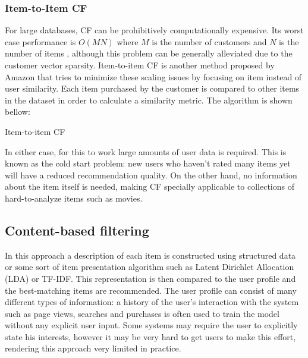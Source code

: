 \documentclass[cic,tc,english]{iiufrgs}
\begin{document}
\subsubsection{Item-to-Item CF}
For large databases, CF can be prohibitively computationally expensive. Its worst case performance is \(O(MN)\) where \(M\) is the number of customers and \(N\) is the number of items \cite{Linden2003}, although this problem can be generally alleviated due to the customer vector sparsity. Item-to-item CF is another method proposed by Amazon that tries to minimize these scaling issues by focusing on item instead of user similarity. Each item purchased by the customer is compared to other items in the dataset in order to calculate a similarity metric. The algorithm is shown bellow:

\begin{algorithm}[H]
 \caption{Item-to-item CF}
\end{algorithm}

In either case, for this to work large amounts of user data is required. This is known as the cold start problem: new users who haven't rated many items yet will have a reduced recommendation quality. On the other hand, no information about the item itself is needed, making CF specially applicable to collections of hard-to-analyze items such as movies.

\subsection{Content-based filtering}
In this approach a description of each item is constructed using structured data or some sort of item presentation algorithm such as Latent Dirichlet Allocation (LDA) or TF-IDF. This representation is then compared to the user profile and the best-matching items are recommended. The user profile can consist of many different types of information: a history of the user's interaction with the system such as page views, searches and purchases is often used to train the model without any explicit user input. Some systems may require the user to explicitly state his interests, however it may be very hard to get users to make this effort, rendering this approach very limited in practice.
\end{document}
